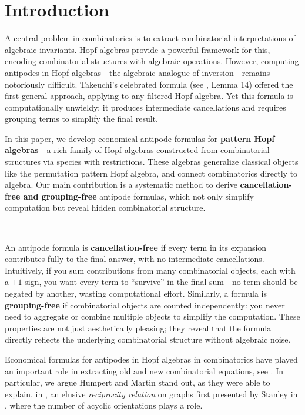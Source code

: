 \documentclass[12pt, reqno]{amsart}
\theoremstyle{definition}
\begin{document}
\maketitle

\tableofcontents


\section{Introduction\label{sec:intro}}

A central problem in combinatorics is to extract combinatorial interpretations of algebraic invariants.
Hopf algebras provide a powerful framework for this, encoding combinatorial structures with algebraic operations.
However, computing antipodes in Hopf algebras---the algebraic analogue of inversion---remains notoriously difficult.
Takeuchi's celebrated formula (see \cite{Takeuchi1971}, Lemma 14) offered the first general approach, applying to any filtered Hopf algebra.
Yet this formula is computationally unwieldy: it produces intermediate cancellations and requires grouping terms to simplify the final result.

In this paper, we develop economical antipode formulas for \textbf{pattern Hopf algebras}---a rich family of Hopf algebras constructed from combinatorial structures via species with restrictions.
These algebras generalize classical objects like the permutation pattern Hopf algebra, and connect combinatorics directly to algebra.
Our main contribution is a systematic method to derive \textbf{cancellation-free and grouping-free} antipode formulas, which not only simplify computation but reveal hidden combinatorial structure.

\

An antipode formula is \textbf{cancellation-free} if every term in its expansion contributes fully to the final answer, with no intermediate cancellations.
Intuitively, if you sum contributions from many combinatorial objects, each with a $\pm 1$ sign, you want every term to ``survive'' in the final sum---no term should be negated by another, wasting computational effort.
Similarly, a formula is \textbf{grouping-free} if combinatorial objects are counted independently: you never need to aggregate or combine multiple objects to simplify the computation.
These properties are not just aesthetically pleasing; they reveal that the formula directly reflects the underlying combinatorial structure without algebraic noise.

Economical formulas for antipodes in Hopf algebras in combinatorics have played an important role in extracting old and new combinatorial equations, see \cite{Schmitt1993, humpert2012incidence, BS2017, aguiar2017hopf, xu2022cancellation}.
In particular, we argue Humpert and Martin stand out, as they were able to explain, in \cite{humpert2012incidence}, an elusive \textit{reciprocity relation} on graphs first presented by Stanley in \cite{stanley1975combinatorial}, where the number of acyclic orientations plays a role.
\end{document}
